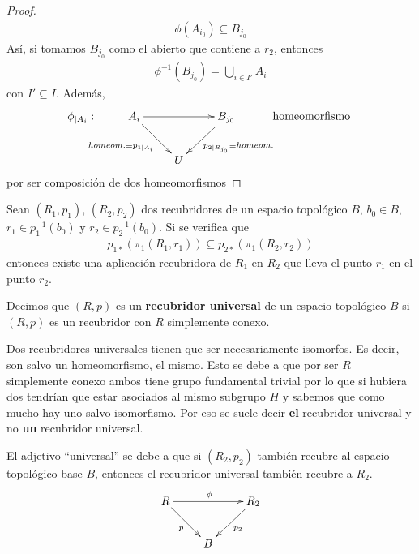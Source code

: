 \begin{prop}
\begin{proof}
\begin{gather*}
            \phi(A_{i_0}) \subseteq B_{j_0}
        \end{gather*}
        Así, si tomamos $B_{j_0}$ como el abierto que contiene a $r_2$, entonces 
        \begin{gather*}
            \phi^{-1}(B_{j_0}) = \bigcup\limits_{i\in I'} A_i
        \end{gather*}
        con $I'\subseteq I$. Además, 
        \begin{gather*}
            \xymatrix{
                \phi_{|A_i} :& A_i \ar[dr]_{ homeom. \equiv p_{1|A_i}} \ar[rr] && B_{j_0} \ar[dl]^{p_{2|B_{j_0}} \equiv homeom.}& \text{ homeomorfismo }\\
                && U
            }
        \end{gather*}
        por ser composición de dos homeomorfismos
    \end{proof}
\end{prop}

\begin{coro}
    Sean $(R_1, p_1)$, $(R_2, p_2)$ dos recubridores de un espacio topológico $B$, $b_0\in B$, $r_1\in p_1^{-1}(b_0)$ y $r_2\in p_2^{-1}(b_0)$. Si se verifica que
    \begin{gather*}
        p_{1*}(\pi_1(R_1, r_1)) \subseteq p_{2*}(\pi_1(R_2, r_2))
    \end{gather*}
    entonces existe una aplicación recubridora de $R_1$ en $R_2$ que lleva el punto $r_1$ en el punto $r_2$.
\end{coro}

\begin{definicion}
    Decimos que $(R,p)$ es un \textbf{recubridor universal} de un espacio topológico $B$ si $(R,p)$ es un recubridor con $R$ simplemente conexo.
\end{definicion}

\begin{observacion}
    Dos recubridores universales tienen que ser necesariamente isomorfos. Es decir, son salvo un homeomorfismo, el mismo. Esto se debe a que por ser $R$ simplemente conexo ambos tiene grupo fundamental trivial por lo que si hubiera dos tendrían que estar asociados al mismo subgrupo $H$ y sabemos que como mucho hay uno salvo isomorfismo. Por eso se suele decir \textbf{el} recubridor universal y no \textbf{un} recubridor universal.
\end{observacion}

\begin{observacion}
    El adjetivo ``universal'' se debe a que si $(R_2, p_2)$ también recubre al espacio topológico base $B$, entonces el recubridor universal también recubre a $R_2$.
    \begin{gather*}
        \xymatrix{
            R \ar[rr]^{\phi} \ar[dr]_{p} && R_2 \ar[dl]^{p_2}\\
            & B
        }
    \end{gather*}
\end{observacion}

